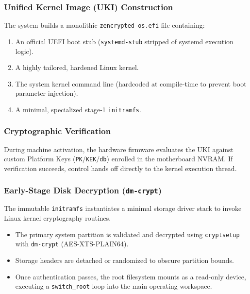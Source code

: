 \documentclass{article}
\begin{document}
\begin{center}
\end{center}

\subsubsection{Unified Kernel Image (UKI) Construction}
The system builds a monolithic \texttt{zencrypted-os.efi} file containing:
\begin{enumerate}
    \item An official UEFI boot stub (\texttt{systemd-stub} stripped of systemd execution logic).
    \item A highly tailored, hardened Linux kernel.
    \item The system kernel command line (hardcoded at compile-time to prevent boot parameter injection).
    \item A minimal, specialized stage-1 \texttt{initramfs}.
\end{enumerate}

\subsubsection{Cryptographic Verification}
During machine activation, the hardware firmware evaluates the UKI against custom Platform Keys (\texttt{PK}/\texttt{KEK}/\texttt{db}) enrolled in the motherboard NVRAM. If verification succeeds, control hands off directly to the kernel execution thread.

\subsubsection{Early-Stage Disk Decryption (\texttt{dm-crypt})}
The immutable \texttt{initramfs} instantiates a minimal storage driver stack to invoke Linux kernel cryptography routines.
\begin{itemize}
    \item The primary system partition is validated and decrypted using \texttt{cryptsetup} with \texttt{dm-crypt} (AES-XTS-PLAIN64).
    \item Storage headers are detached or randomized to obscure partition bounds.
    \item Once authentication passes, the root filesystem mounts as a read-only device, executing a \texttt{switch\_root} loop into the main operating workspace.
\end{itemize}
\end{document}
